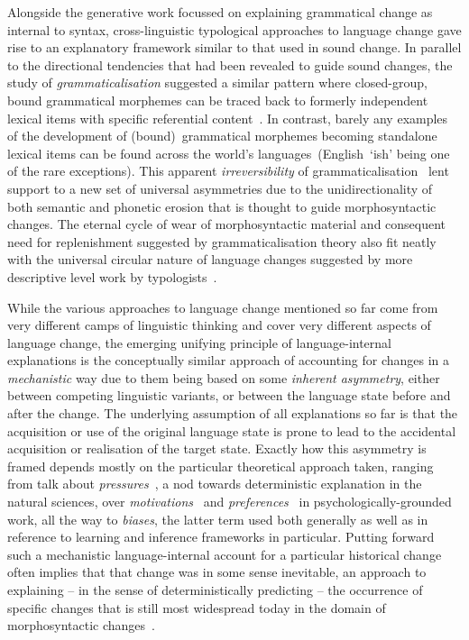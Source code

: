 Alongside the generative work focussed on explaining grammatical change as internal to syntax, cross-linguistic typological approaches to language change gave rise to an explanatory framework similar to that used in sound change. In parallel to the directional tendencies that had been revealed to guide sound changes, the study of \emph{grammaticalisation} suggested a similar pattern where closed-group, bound grammatical morphemes can be traced back to formerly independent lexical items with specific referential content~\citep{Hopper1993}.
In contrast, barely any examples of the development of (bound)~grammatical morphemes becoming standalone lexical items can be found across the world's languages~(English~`ish' being one of the rare exceptions).
This apparent \emph{irreversibility} of grammaticalisation~\citep{Haspelmath2004directionality} lent support to a new set of universal asymmetries due to the unidirectionality of both semantic and phonetic erosion that is thought to guide morphosyntactic changes. The eternal cycle of wear of morphosyntactic material and consequent need for replenishment suggested by grammaticalisation theory also fit neatly with the universal circular nature of language changes suggested by more descriptive level work by typologists~\citep{Hodge1970}.

While the various approaches to language change mentioned so far come from very different camps of linguistic thinking and cover very different aspects of language change, 
the emerging unifying principle of language-internal explanations is the conceptually similar approach of accounting for changes in a \emph{mechanistic} way due to them being based on some \emph{inherent asymmetry}, either between competing linguistic variants, or between the language state before and after the change. The underlying assumption of all explanations so far is that the acquisition or use of the original language state is prone to lead to the accidental acquisition or realisation of the target state. Exactly how this asymmetry is framed depends mostly on the particular theoretical approach taken, ranging from talk about \emph{pressures}~\citep[e.g.][]{Thomsen2006}, a nod towards deterministic explanation in the natural sciences, over \emph{motivations}~\citep{MacWhinney2014} and \emph{preferences}~\citep{Fedzechkina2016} in psychologically-grounded work, all the way to \emph{biases}, the latter term used both generally as well as in reference to learning and inference frameworks in particular.
Putting forward such a mechanistic language-internal account for a particular historical change often implies that that change was in some sense inevitable, an approach to explaining -- in the sense of deterministically predicting -- the occurrence of specific changes that is still most widespread today in the domain of morphosyntactic changes~\citep{Lightfoot2010}.

